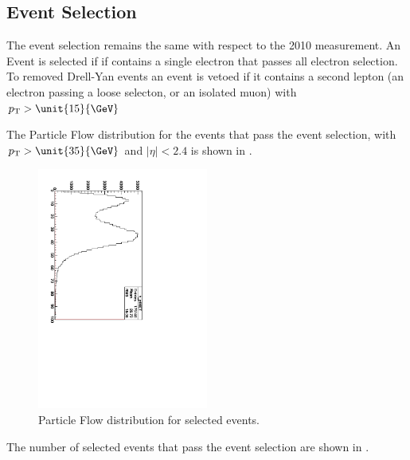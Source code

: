 \subsection{Event Selection}
The event selection remains the same with respect to the 2010 measurement.
An Event is selected if if contains a single electron that passes all electron
selection.
To removed Drell-Yan events an event is vetoed if it contains a second lepton
(an electron passing a loose selecton, or an isolated muon) with $\PT > 
\unit{15}{\GeV}$

The Particle Flow \ETm distribution for the events that pass the event
selection, with $\PT > \unit{35}{\GeV}$ and $|\eta| < 2.4$ is shown in
.

\begin{figure}[htb]
  \centering
  \includegraphics[width=0.5\textwidth]{pfmet}
  \caption{Particle Flow \ETm distribution for selected events.}
  \label{asym840:pfmet}
\end{figure}

The number of selected events that pass the event selection are shown in
.

